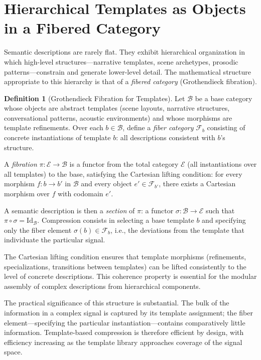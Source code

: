 \documentclass[12pt,a4paper]{article}
\theoremstyle{definition}
\newtheorem{definition}[theorem]{Definition}
\theoremstyle{remark}
\begin{document}
\section{Hierarchical Templates as Objects in a Fibered Category}
\label{sec:fibered}

Semantic descriptions are rarely flat. They exhibit hierarchical organization in which high-level structures---narrative templates, scene archetypes, prosodic patterns---constrain and generate lower-level detail. The mathematical structure appropriate to this hierarchy is that of a \emph{fibered category} (Grothendieck fibration).

\begin{definition}[Grothendieck Fibration for Templates]
Let $\mathcal{B}$ be a base category whose objects are abstract templates (scene layouts, narrative structures, conversational patterns, acoustic environments) and whose morphisms are template refinements. Over each $b \in \mathcal{B}$, define a \emph{fiber category} $\mathcal{F}_b$ consisting of concrete instantiations of template $b$: all descriptions consistent with $b$'s structure.

A \emph{fibration} $\pi : \mathcal{E} \rightarrow \mathcal{B}$ is a functor from the total category $\mathcal{E}$ (all instantiations over all templates) to the base, satisfying the Cartesian lifting condition: for every morphism $f : b \rightarrow b'$ in $\mathcal{B}$ and every object $e' \in \mathcal{F}_{b'}$, there exists a Cartesian morphism over $f$ with codomain $e'$.
\end{definition}

A semantic description is then a \emph{section} of $\pi$: a functor $\sigma : \mathcal{B} \rightarrow \mathcal{E}$ such that $\pi \circ \sigma = \mathrm{Id}_\mathcal{B}$. Compression consists in selecting a base template $b$ and specifying only the fiber element $\sigma(b) \in \mathcal{F}_b$, i.e., the deviations from the template that individuate the particular signal.

The Cartesian lifting condition ensures that template morphisms (refinements, specializations, transitions between templates) can be lifted consistently to the level of concrete descriptions. This coherence property is essential for the modular assembly of complex descriptions from hierarchical components.

The practical significance of this structure is substantial. The bulk of the information in a complex signal is captured by its template assignment; the fiber element---specifying the particular instantiation---contains comparatively little information. Template-based compression is therefore efficient by design, with efficiency increasing as the template library approaches coverage of the signal space.
\end{document}
